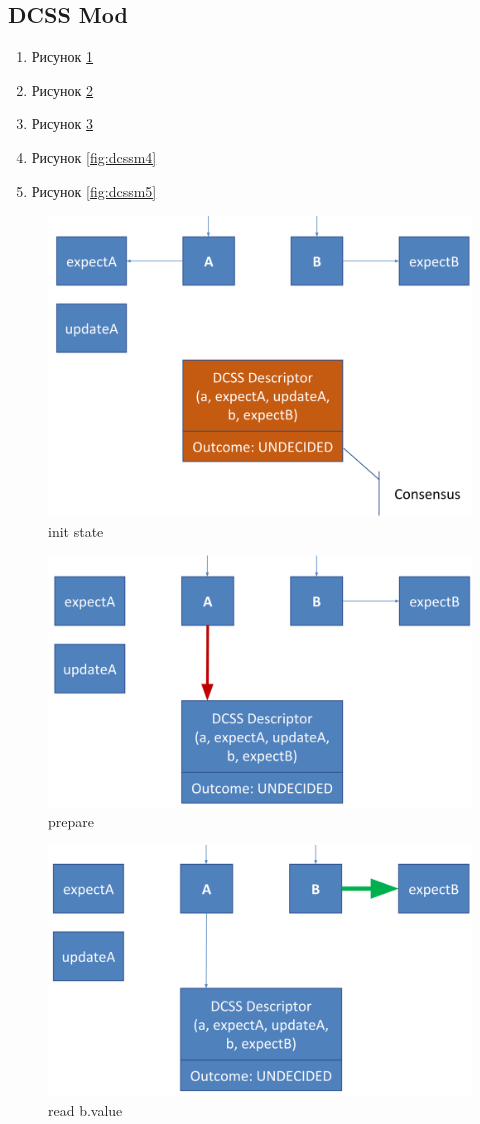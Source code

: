 \documentclass[10pt,a4paper,oneside,titlepage]{article}
\theoremstyle{plain}
\theoremstyle{defenition}
\begin{document}
\subsection{DCSS Mod}

\begin{enumerate}
	\item Рисунок \ref{fig:dcssm1}
	\item Рисунок \ref{fig:dcssm2}
	\item Рисунок \ref{fig:dcssm3}
	\item Рисунок \ref{fig:dcssm4}
	\item Рисунок \ref{fig:dcssm5}
\end{enumerate}

\begin{figure}[h!]
	\centering
	\includegraphics[width=0.4\linewidth]{pictures/DCSSM1}
	\caption{init state}
	\label{fig:dcssm1}
\end{figure}

\begin{figure}[h!]
	\centering
	\includegraphics[width=0.4\linewidth]{pictures/DCSSM2}
	\caption{prepare}
	\label{fig:dcssm2}
\end{figure}

\begin{figure}[h!]
	\centering
	\includegraphics[width=0.4\linewidth]{pictures/DCSSM3}
	\caption{read b.value}
	\label{fig:dcssm3}
\end{figure}
\end{document}
